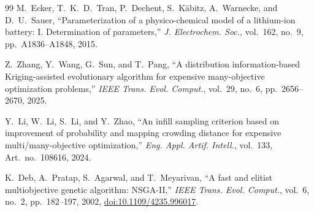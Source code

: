 \documentclass[journal]{IEEEtran}
\begin{document}
\begin{thebibliography}{99}
M.~Ecker, T.~K.~D.~Tran, P.~Dechent,
S.~K\"abitz, A.~Warnecke, and D.~U.~Sauer,
``Parameterization of a physico-chemical model of a lithium-ion
battery: I. Determination of parameters,''
\textit{J. Electrochem. Soc.},
vol.~162, no.~9, pp.~A1836--A1848, 2015.

Z.~Zhang, Y.~Wang, G.~Sun, and T.~Pang,
``A distribution information-based Kriging-assisted evolutionary
algorithm for expensive many-objective optimization problems,''
\textit{IEEE Trans. Evol. Comput.},
vol.~29, no.~6, pp.~2656--2670, 2025.

Y.~Li, W.~Li, S.~Li, and Y.~Zhao,
``An infill sampling criterion based on improvement of probability
and mapping crowding distance for expensive multi/many-objective
optimization,''
\textit{Eng. Appl. Artif. Intell.},
vol.~133, Art.~no.~108616, 2024.

K.~Deb, A.~Pratap, S.~Agarwal, and T.~Meyarivan,
``A fast and elitist multiobjective genetic algorithm: NSGA-II,''
\textit{IEEE Trans. Evol. Comput.},
vol.~6, no.~2, pp.~182--197, 2002,
\href{https://doi.org/10.1109/4235.996017}
{doi:10.1109/4235.996017}.

\end{thebibliography}
\end{document}
